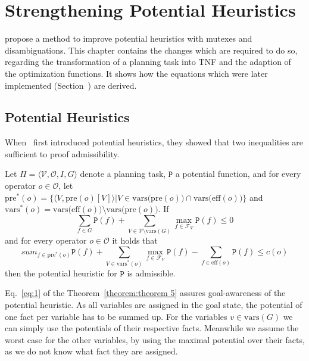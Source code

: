 
\chapter{Strengthening Potential Heuristics}\label{ch:strengthening-potential-heuristics}

\citeauthor{fivser2020strengthening} propose a method to improve potential heuristics with mutexes and disambiguations.
This chapter contains the changes which are required to do so, regarding the transformation of a planning task into TNF and the adaption of the optimization functions.
It shows how the equations which were later implemented (Section~) are derived.

\section{Potential Heuristics}\label{sec:potential-heuristics}

When~\citeauthor{pommerening2015non} first introduced potential heuristics, they showed that two inequalities are sufficient to proof admissibility.

\begin{theorem}
    \label{theorem:theorem 5} %
    Let $\Pi = \langle \mathcal{V}, \mathcal{O}, I, G \rangle$ denote a planning task, $\mathtt{P}$ a
    potential function, and for every operator $o\in\mathcal{O}$, let
    $\mathrm{pre}^*(o)=\{\langle V, \mathrm{pre}(o)[V]\rangle |V\in \mathrm{vars(pre}(o))\cap\mathrm{vars(eff}(o))\}$ and
    $\mathrm{vars}^*(o)=\mathrm{vars(eff}(o))\setminus\mathrm{vars(pre}(o))$. If
    \begin{equation}\sum_{f\in G}\mathtt{P}(f)+\sum_{V\in\mathcal{V}\setminus\mathrm{vars}(G)}\max_{f\in\mathcal{F}_V}\mathtt{P}(f)\leq0\label{eq:1}\end{equation}
    and for every operator $o\in\mathcal{O}$ it holds that
    \begin{equation}sum_{f\in\mathrm{pre}^*(o)}\mathtt{P}(f)+\sum_{V\in\mathrm{vars}^*(o)}\max_{f\in\mathcal{F}_V}\mathtt{P}(f)-\sum_{f\in\mathrm{eff}(o)}\mathtt{P}(f)\leq c(o)\label{eq:2}\end{equation}
    then the potential heuristic for $\mathtt{P}$ is admissible.
\end{theorem}


Eq.~\eqref{eq:1} of the Theorem~\ref{theorem:theorem 5} assures goal-awareness of the potential heuristic.
As all variables are assigned in the goal state, the potential of one fact per variable has to be summed up.
For the variables $v\in\text{vars}(G)$ we can simply use the potentials of their respective facts.
Meanwhile we assume the worst case for the other variables, by using the maximal potential over their facts, as we do not know what fact they are assigned.

